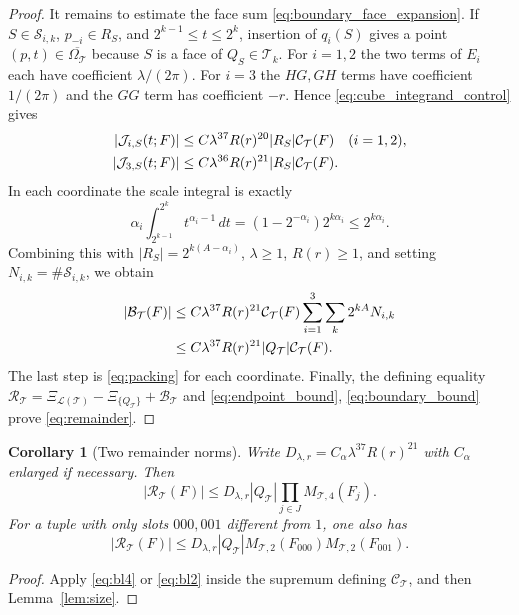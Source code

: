 \documentclass[12pt,reqno]{amsart}
\theoremstyle{plain}
\newtheorem{corollary}[theorem]{Corollary}
\theoremstyle{definition}
\theoremstyle{remark}
\numberwithin{equation}{section}
\newcommand{\T}{\mathcal T}
\newcommand{\dd}{\,d}
\begin{document}
\begin{proof}
It remains to estimate the face sum
\eqref{eq:boundary_face_expansion}. If $S\in\mathscr S_{i,k}$,
$p_{-i}\in R_S$, and $2^{k-1}\le t\le2^k$, insertion of
$q_i(S)$ gives a point $(p,t)\in\overline{\Omega_\T}$ because
$S$ is a face of $Q_S\in\T_k$. For $i=1,2$ the two terms of
$E_i$ each have coefficient $\lambda/(2\pi)$. For $i=3$ the
$HG,GH$ terms have coefficient $1/(2\pi)$ and the $GG$ term has
coefficient $-r$. Hence \eqref{eq:cube_integrand_control} gives
\begin{align}
 |\mathcal J_{i,S}(t;F)|
 &\le C\lambda^{37}R(r)^{20}|R_S|\mathcal C_\T(F)
                 \quad(i=1,2),\notag\\
 |\mathcal J_{3,S}(t;F)|
 &\le C\lambda^{36}R(r)^{21}|R_S|\mathcal C_\T(F).
                                                  \label{eq:face_kernel_bound}
\end{align}
In each coordinate the scale integral is exactly
\[
 \alpha_i\int_{2^{k-1}}^{2^k}t^{\alpha_i-1}\dd t
       =(1-2^{-\alpha_i})2^{k\alpha_i}\le2^{k\alpha_i}.
\]
Combining this with $|R_S|=2^{k(A-\alpha_i)}$,
$\lambda\ge1$, $R(r)\ge1$, and setting
$N_{i,k}=\#\mathscr S_{i,k}$, we obtain
\begin{align}
 |\mathcal B_\T(F)|
 &\le C\lambda^{37}R(r)^{21}\mathcal C_\T(F)
                  \sum_{i=1}^3\sum_k2^{kA}N_{i,k}\notag\\
 &\le C\lambda^{37}R(r)^{21}|Q_\T|\mathcal C_\T(F).
                                                  \label{eq:boundary_bound}
\end{align}
The last step is \eqref{eq:packing} for each coordinate. Finally,
the defining equality
$\mathcal R_\T=\Xi_{\mathcal L(\T)}-\Xi_{\{Q_\T\}}+\mathcal B_\T$
and \eqref{eq:endpoint_bound}, \eqref{eq:boundary_bound} prove
\eqref{eq:remainder}.
\end{proof}

\begin{corollary}[Two remainder norms]\label{cor:remainder_norms}
Write $D_{\lambda,r}=C_\alpha\lambda^{37}R(r)^{21}$ with
$C_\alpha$ enlarged if necessary. Then
\[
 |\mathcal R_\T(F)|\le D_{\lambda,r}|Q_\T|
                   \prod_{j\in J}M_{\T,4}(F_j).
\]
For a tuple with only slots $000,001$ different from $1$, one also has
\[
 |\mathcal R_\T(F)|\le D_{\lambda,r}|Q_\T|
                    M_{\T,2}(F_{000})M_{\T,2}(F_{001}).
\]
\end{corollary}
\begin{proof}
Apply \eqref{eq:bl4} or \eqref{eq:bl2} inside the supremum defining
$\mathcal C_\T$, and then Lemma~\ref{lem:size}.
\end{proof}
\end{document}
